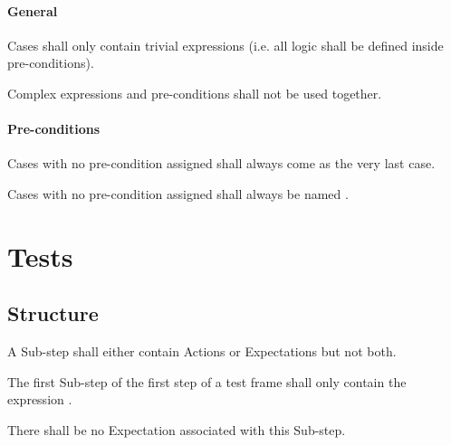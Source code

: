 \documentclass[draft]{efsguide}
\begin{document}
\subsubsection{General}
\begin{rules}
\item \label{rule:functions_cases_general_trivialexpressions} Cases shall only contain trivial expressions (i.e. all logic shall be defined inside pre-conditions). 
\item {} Complex expressions and pre-conditions shall not be used together.  
\end{rules}

\subsubsection{Pre-conditions}
\begin{rules}
\item Cases with no pre-condition assigned shall always come as the very last case. 
\item Cases with no pre-condition assigned shall always be named . 
\end{rules}

\chapter{Tests}

\section{Structure}
\begin{rules}
\item {} A Sub-step shall either contain Actions or Expectations but not both. 
\item The first Sub-step of the first step of a test frame shall only contain the expression . 
\begin{rules}
\item There shall be no Expectation associated with this Sub-step. 
\end{rules}
\end{rules}
\end{document}
